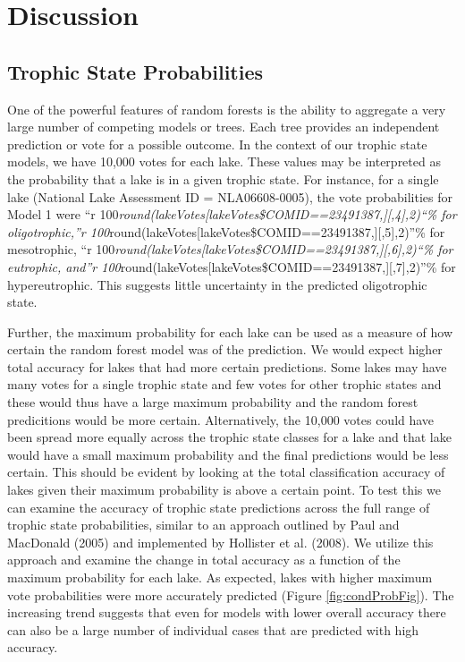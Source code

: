 \documentclass[11pt,]{article}
\begin{document}
\section{Discussion}\label{discussion}

\subsection{Trophic State
Probabilities}\label{trophic-state-probabilities}

One of the powerful features of random forests is the ability to
aggregate a very large number of competing models or trees. Each tree
provides an independent prediction or vote for a possible outcome. In
the context of our trophic state models, we have 10,000 votes for each
lake. These values may be interpreted as the probability that a lake is
in a given trophic state. For instance, for a single lake (National Lake
Assessment ID = NLA06608-0005), the vote probabilities for Model 1 were
``r
100\emph{round(lakeVotes{[}lakeVotes\$COMID==23491387,{]}{[},4{]},2)``\%
for oligotrophic,''r
100}round(lakeVotes{[}lakeVotes\$COMID==23491387,{]}{[},5{]},2)''\% for
mesotrophic, ``r
100\emph{round(lakeVotes{[}lakeVotes\$COMID==23491387,{]}{[},6{]},2)``\%
for eutrophic, and''r
100}round(lakeVotes{[}lakeVotes\$COMID==23491387,{]}{[},7{]},2)''\% for
hypereutrophic. This suggests little uncertainty in the predicted
oligotrophic state.

Further, the maximum probability for each lake can be used as a measure
of how certain the random forest model was of the prediction. We would
expect higher total accuracy for lakes that had more certain
predictions. Some lakes may have many votes for a single trophic state
and few votes for other trophic states and these would thus have a large
maximum probability and the random forest predicitions would be more
certain. Alternatively, the 10,000 votes could have been spread more
equally across the trophic state classes for a lake and that lake would
have a small maximum probability and the final predictions would be less
certain. This should be evident by looking at the total classification
accuracy of lakes given their maximum probability is above a certain
point. To test this we can examine the accuracy of trophic state
predictions across the full range of trophic state probabilities,
similar to an approach outlined by Paul and MacDonald (2005) and
implemented by Hollister et al. (2008). We utilize this approach and
examine the change in total accuracy as a function of the maximum
probability for each lake. As expected, lakes with higher maximum vote
probabilities were more accurately predicted (Figure
\ref{fig:condProbFig}). The increasing trend suggests that even for
models with lower overall accuracy there can also be a large number of
individual cases that are predicted with high accuracy.
\end{document}
